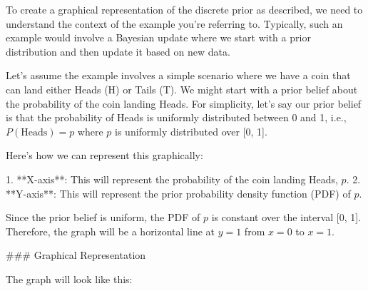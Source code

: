To create a graphical representation of the discrete prior as described, we need to understand the context of the example you're referring to. Typically, such an example would involve a Bayesian update where we start with a prior distribution and then update it based on new data.

Let's assume the example involves a simple scenario where we have a coin that can land either Heads (H) or Tails (T). We might start with a prior belief about the probability of the coin landing Heads. For simplicity, let's say our prior belief is that the probability of Heads is uniformly distributed between 0 and 1, i.e., \( P(\text{Heads}) = p \) where \( p \) is uniformly distributed over [0, 1].

Here’s how we can represent this graphically:

1. **X-axis**: This will represent the probability of the coin landing Heads, \( p \).
2. **Y-axis**: This will represent the prior probability density function (PDF) of \( p \).

Since the prior belief is uniform, the PDF of \( p \) is constant over the interval [0, 1]. Therefore, the graph will be a horizontal line at \( y = 1 \) from \( x = 0 \) to \( x = 1 \).

### Graphical Representation

The graph will look like this:

